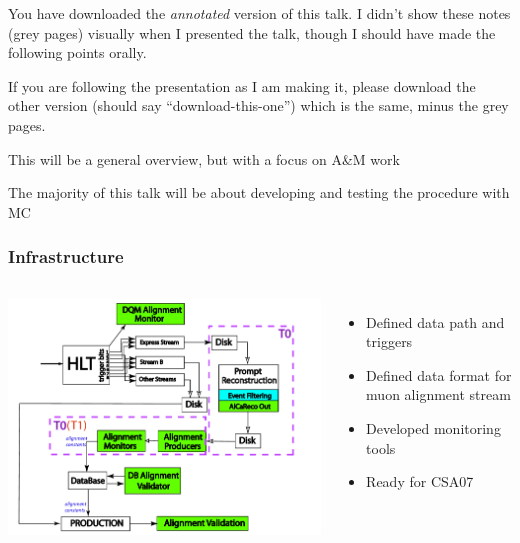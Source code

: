 \documentclass[compress]{beamer}
\begin{document}
\begin{notes}
\item You have downloaded the {\it annotated} version of this talk.  I
didn't show these notes (grey pages) visually when I presented the
talk, though I should have made the following points orally.

\vspace{0.2 cm}
If you are following the presentation as I am making it, please
download the other version (should say ``download-this-one'') which is the
same, minus the grey pages.

\vfill
\item This will be a general overview, but with a focus on A\&M work
\item The majority of this talk will be about developing and testing the procedure with MC
\end{notes}

\begin{frame}
\frametitle{Infrastructure}
\begin{columns}
\includegraphics[width=1.2\linewidth]{realplots/alexeis_graph2.png}
\begin{itemize}
\item Defined data path and triggers 
\item Defined data format for muon alignment stream
\item Developed monitoring tools
\item Ready for CSA07
\end{itemize}
\end{columns}
\end{frame}
\end{document}
